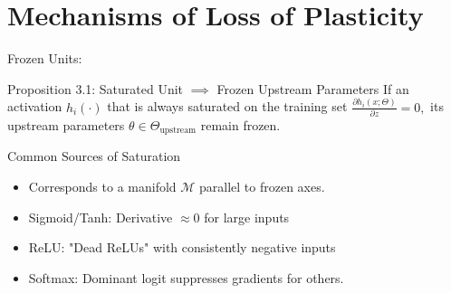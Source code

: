 \documentclass{beamer}
\newcommand{\Loss}{\mathcal{L}}
\begin{document}
\section{Mechanisms of Loss of Plasticity}

\begin{frame}{Frozen Units:}
    \begin{block}{Proposition 3.1: Saturated Unit $\implies$ Frozen Upstream Parameters}
        If an activation $h_i(\cdot)$ that is always saturated on the training set $\frac{\partial h_i(x;\Theta)}{\partial z} = 0,$
        its upstream parameters $\theta \in \Theta_{\text{upstream}}$ remain frozen. 
    \end{block}
    
    \begin{alertblock}{Common Sources of Saturation}
        \begin{itemize}
            \item Corresponds to a manifold $\mathcal{M}$ parallel to frozen axes. 
            \item Sigmoid/Tanh: Derivative $\approx 0$ for large inputs
            \item ReLU: "Dead ReLUs" with consistently negative inputs
            \item Softmax: Dominant logit suppresses gradients for others.
        \end{itemize}
    \end{alertblock}
\end{frame}
\end{document}
